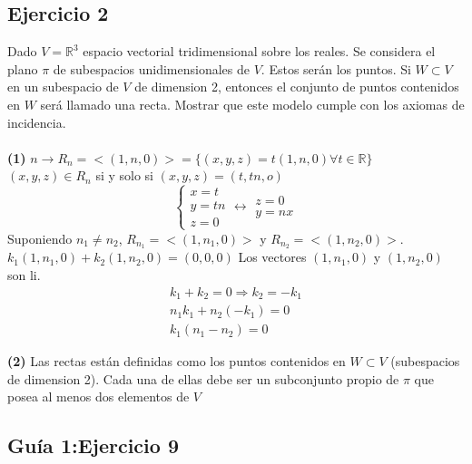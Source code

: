 \documentclass[a4paper]{article}
\begin{document}
\subsection{Ejercicio 2}
Dado $V=\mathbb{R}^3$ espacio vectorial tridimensional sobre los reales. Se considera el plano $\pi$ de subespacios unidimensionales de $V$. Estos serán los puntos. Si $W \subset V$ en un subespacio de $V$ de dimension 2, entonces el conjunto de puntos contenidos en $W$ será llamado una recta. Mostrar que este modelo cumple con los axiomas de incidencia.\\\\
\textbf{(1)} $n \rightarrow R_n=<(1,n,0)>=\{(x,y,z)=t(1,n,0) \forall t \in \mathbb{R}\}$\\
$(x,y,z) \in R_n$ si y solo si $(x,y,z)=(t,tn,o)$\\
\begin{equation}
    \left\{
    \begin{array}{l}
        x=t\\
        y=tn\\
        z=0
    \end{array}
    \leftrightarrow
    \begin{array}{l}
        z=0\\
        y=nx
    \end{array}
    \right.
\end{equation}
Suponiendo $n_1\neq n_2$, $R_{n_1}=<(1,n_1,0)>$ y $R_{n_2}=<(1,n_2,0)>$.\\
$k_1(1,n_1,0)+k_2(1,n_2,0)=(0,0,0)$ Los vectores $(1,n_1,0)$ y $(1,n_2,0)$ son li.
\begin{equation}
    \begin{array}{c}
        k_1+k_2=0 \Rightarrow k_2=-k_1\\
        n_1k_1+n_2(-k_1)=0\\
        k_1(n_1-n_2)=0        
    \end{array}
\end{equation}

\textbf{(2)} Las rectas están definidas como los puntos contenidos en $W\subset V$ (subespacios de dimension 2). Cada una de ellas debe ser un subconjunto propio de $\pi$ que posea al menos dos elementos de $V$ 

\subsection{Guía 1:Ejercicio 9}
\end{document}
